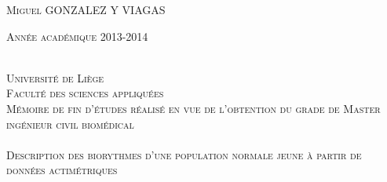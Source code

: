 \begin{titlepage}
\begin{center}


\begin{minipage}[ht]{0.4\textwidth}
\begin{flushleft} \large
\textsc{Miguel GONZALEZ Y VIAGAS}
\end{flushleft}
\end{minipage}
\begin{minipage}[ht]{0.4\textwidth}
\begin{flushright} \large
\textsc{Année académique 2013-2014}
\end{flushright}
\end{minipage}\\[2cm]



\textsc{\LARGE Université de Liège} \\[1cm]
\textsc{\Large Faculté des sciences appliquées} \\[1cm]
\textsc{\large Mémoire de fin d'études réalisé en vue de l'obtention du grade de Master ingénieur civil biomédical} \\[1cm]


\HRule \\[4mm]
\textsc{\Large Description des biorythmes d’une population normale jeune à partir de données actimétriques} \\[1mm]
\HRule \\[3cm]


\end{center}
\end{titlepage}
